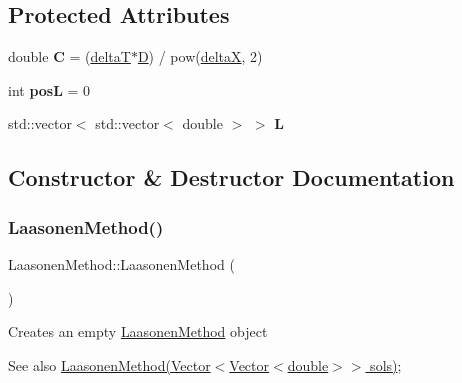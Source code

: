 \subsection*{Protected Attributes}
\begin{DoxyCompactItemize}
\item 
\mbox{\label{class_laasonen_method_a9261b579f612bf4ce6b0d85cbe39bb56}} 
double {\bfseries C} = (\hyperlink{class_solution_a116a08a1a8793618fb5269016cfd9b61}{deltaT}$\ast$\hyperlink{class_solution_af647b9b893549259060034672babb0f8}{D}) / pow(\hyperlink{class_solution_a8e97e5534ddcde31983432b8fb2050ff}{deltaX}, 2)
\item 
\mbox{\label{class_laasonen_method_a9bfc5f53066a6dec716d07d046274669}} 
int {\bfseries posL} = 0
\item 
\mbox{\label{class_laasonen_method_addfca3dd9aebb1fc71ad049f11a12480}} 
std\+::vector$<$ std\+::vector$<$ double $>$ $>$ {\bfseries L}
\end{DoxyCompactItemize}


\subsection{Constructor \& Destructor Documentation}
\mbox{\label{class_laasonen_method_a1bff2dc73fc66c3070fc7a187ff556f9}} 
\subsubsection{\texorpdfstring{Laasonen\+Method()}{LaasonenMethod()}\hspace{0.1cm}{\footnotesize\ttfamily [1/2]}}
{\footnotesize\ttfamily Laasonen\+Method\+::\+Laasonen\+Method (\begin{DoxyParamCaption}{ }\end{DoxyParamCaption})}

Creates an empty \hyperlink{class_laasonen_method}{Laasonen\+Method} object \begin{DoxySeeAlso}{See also}
\hyperlink{class_laasonen_method}{Laasonen\+Method(\+Vector$<$\+Vector$<$double$>$$>$ sols)}; 
\end{DoxySeeAlso}
\mbox{\label{class_laasonen_method_a55dc0b88c2298a492d186564b9baed26}} 
